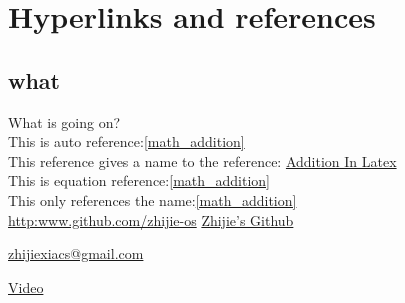 \chapter{Hyperlinks and references} 

\section{what}
    What is going on?\\
This is auto reference:\autoref{math_addition}\\
This reference gives a name to the reference: \hyperref[math_addition]{Addition In Latex}\\

This is equation reference:\eqref{math_addition}\\

This only references the name:\ref*{math_addition}\\


\url{http:www.github.com/zhijie-os}
\href{http:www.github.com/zhijie-os}{Zhijie's Github}

\href{mailto:zhijiexiacs@gmail.com}{zhijiexiacs@gmail.com}

\href{run:chapters/chapter2/demo.mkv}{Video}

